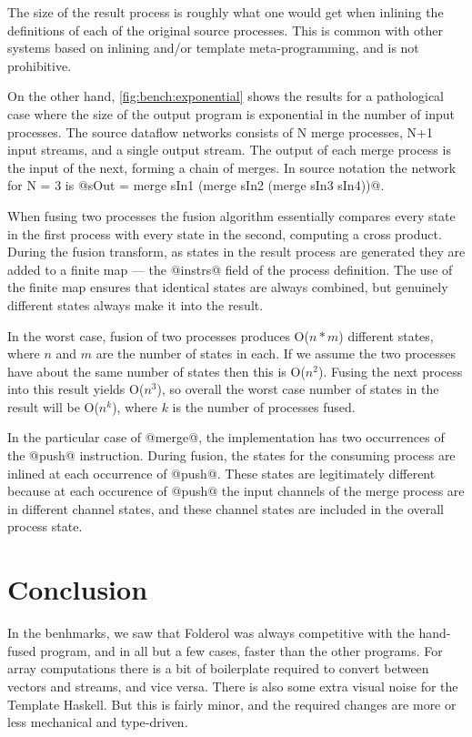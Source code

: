 The size of the result process is roughly what one would get when inlining the definitions of each of the original source processes. This is common with other systems based on inlining and/or template meta-programming, and is not prohibitive.

On the other hand, \autoref{fig:bench:exponential} shows the results for a pathological case where the size of the output program is exponential in the number of input processes. The source dataflow networks consists of N merge processes, N+1 input streams, and a single output stream. The output of each merge process is the input of the next, forming a chain of merges. In source notation the network for N = 3 is @sOut = merge sIn1 (merge sIn2 (merge sIn3 sIn4))@.

When fusing two processes the fusion algorithm essentially compares every state in the first process with every state in the second, computing a cross product. During the fusion transform, as states in the result process are generated they are added to a finite map --- the @instrs@ field of the process definition. The use of the finite map ensures that identical states are always combined, but genuinely different states always make it into the result. 

In the worst case, fusion of two processes produces O($n*m$) different states, where $n$ and $m$ are the number of states in each. If we assume the two processes have about the same number of states then this is O($n^2$). Fusing the next process into this result yields O($n^3$), so overall the worst case number of states in the result will be O($n^k$), where $k$ is the number of processes fused. 

In the particular case of @merge@, the implementation has two occurrences of the @push@ instruction. During fusion, the states for the consuming process are inlined at each occurrence of @push@. These states are legitimately different because at each occurence of @push@ the input channels of the merge process are in different channel states, and these channel states are included in the overall process state.





\section{Conclusion}
In the benhmarks, we saw that Folderol was always competitive with the hand-fused program, and in all but a few cases, faster than the other programs.
For array computations there is a bit of boilerplate required to convert between vectors and streams, and vice versa.
There is also some extra visual noise for the Template Haskell.
But this is fairly minor, and the required changes are more or less mechanical and type-driven.

